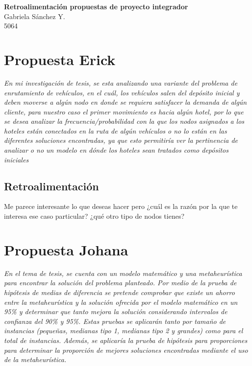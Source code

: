 \documentclass[12pt]{article}
\begin{document}
	\thispagestyle{empty}

	\begin{center}
		{\Large \bf Retroalimentación propuestas de proyecto integrador}\\
		Gabriela S\'anchez Y.\\
		5064
	\end{center}
  
\section{Propuesta Erick}

{\em En mi investigación de tesis, se esta analizando una variante del problema de enrutamiento de vehículos, en el cuál, los vehículos salen del depósito inicial y deben moverse a algún nodo en donde se requiera satisfacer la demanda de algún cliente, para nuestro caso el primer movimiento es hacia algún hotel, por lo que se desea analizar la frecuencia/probabilidad con la que los nodos asignados a los hoteles están conectados en la ruta de algún vehículos o no lo están en las diferentes soluciones encontradas, ya que esto permitiría ver la pertinencia de analizar o no un modelo en dónde los hoteles sean tratados como depósitos iniciales}

\subsection{Retroalimentación}
Me parece interesante lo que deseas hacer pero ¿cuál es la razón por la que te interesa ese caso particular? ¿qué otro tipo de nodos tienes?

\section{Propuesta Johana}
{\em En el tema de tesis, se cuenta con un modelo matemático y una metaheurística para encontrar la solución del problema planteado. Por medio de la prueba de hipótesis de medias de diferencia se pretende comprobar que existe un ahorro entre la metaheurística y la solución ofrecida por el modelo matemático en un 95\% y determinar que tanto mejora la solución considerando intervalos de confianza del 90\% y 95\%. Estas pruebas se aplicarán tanto por tamaño de instancias (pequeñas, medianas tipo 1, medianas tipo 2 y grandes) como para el total de instancias. Además, se aplicaría la prueba de hipótesis para proporciones para determinar la proporción de mejores soluciones encontradas mediante el uso de la metaheurística.}
\end{document}
